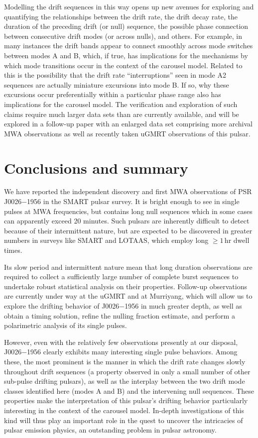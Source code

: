 \documentclass[linenumbers]{aastex631}
\newcommand{\psr}{J0026$-$1956}
\begin{document}
Modelling the drift sequences in this way opens up new avenues for exploring and quantifying the relationships between the drift rate, the drift decay rate, the duration of the preceding drift (or null) sequence, the possible phase connection between consecutive drift modes (or across nulls), and others.
For example, in many instances the drift bands appear to connect smoothly across mode switches between modes A and B, which, if true, has implications for the mechanisms by which mode transitions occur in the context of the carousel model.
Related to this is the possibility that the drift rate ``interruptions'' seen in mode A2 sequences are actually miniature excursions into mode B.
If so, why these excursions occur preferentially within a particular phase range also has implications for the carousel model.
The verification and exploration of such claims require much larger data sets than are currently available, and will be explored in a follow-up paper with an enlarged data set comprising more archival MWA observations as well as recently taken uGMRT observations of this pulsar.

\section{Conclusions and summary}
\label{sec:conclusions}

We have reported the independent discovery and first MWA observations of PSR \psr{} in the SMART pulsar survey.
It is bright enough to see in single pulses at MWA frequencies, but contains long null sequences which in some cases can apparently exceed 20 minutes.
Such pulsars are inherently difficult to detect because of their intermittent nature, but are expected to be discovered in greater numbers in surveys like SMART and LOTAAS, which employ long $\ge 1\,$hr dwell times.

Its slow period and intermittent nature mean that long duration observations are required to collect a sufficiently large number of complete burst sequences to undertake robust statistical analysis on their properties.
Follow-up observations are currently under way at the uGMRT and at Murriyang, which will allow us to explore the drifting behavior of \psr{} in much greater depth, as well as obtain a timing solution, refine the nulling fraction estimate, and perform a polarimetric analysis of its single pulses.

However, even with the relatively few observations presently at our disposal, \psr{} clearly exhibits many interesting single pulse behaviors.
Among these, the most prominent is the manner in which the drift rate changes slowly throughout drift sequences (a property observed in only a small number of other sub-pulse drifting pulsars), as well as the interplay between the two drift mode classes identified here (modes A and B) and the intervening null sequences.
These properties make the interpretation of this pulsar's drifting behavior particularly interesting in the context of the carousel model.
In-depth investigations of this kind will thus play an important role in the quest to uncover the intricacies of pulsar emission physics, an outstanding problem in pulsar astronomy.
\end{document}
